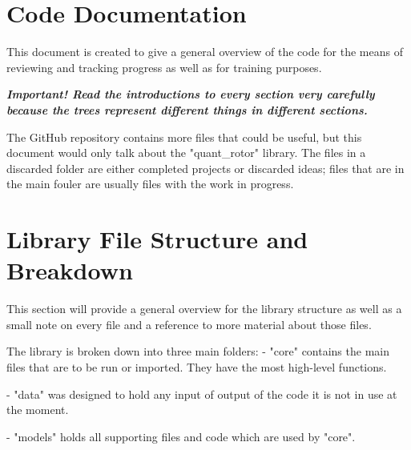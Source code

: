 \documentclass[a4paper,10pt]{article}
\begin{document}
\tableofcontents

\section*{Code Documentation}

This document is created to give a general overview of the code for the means of reviewing and tracking progress as well as for training purposes.

\textbf{\itshape Important! Read the introductions to every section very carefully because the trees represent different things in different sections.}

The GitHub repository contains more files that could be useful, but
this document would only talk about the "quant\_rotor" library. The files in a discarded folder are either completed projects or discarded ideas; files that are in the main fouler are usually files with the work in progress.






\section*{Library File Structure and Breakdown}

This section will provide a general overview for the library structure as well as a small note on every
file and a reference to more material about those files.\newline

The library is broken down into three main folders:
\newline \newline
- "core" contains the main files that are to be run or imported. They have the most high-level functions.

- "data" was designed to hold any input of output of the code it is not in use at the moment.

- "models" holds all supporting files and code which are used by "core".
\newline
\end{document}

